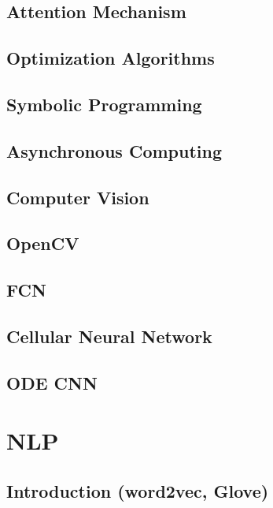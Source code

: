 \documentclass[11pt,fleqn]{book} %
\begin{document}
\chapter{Attention Mechanism}
\chapter{Optimization Algorithms}
\chapter{Symbolic Programming}
\chapter{Asynchronous Computing}
\chapter{Computer Vision}
\chapter{OpenCV}
\chapter{FCN}
\chapter{Cellular Neural Network}
\chapter{ODE CNN}


\part{NLP}


\chapter{Introduction (word2vec, Glove)}
\end{document}
